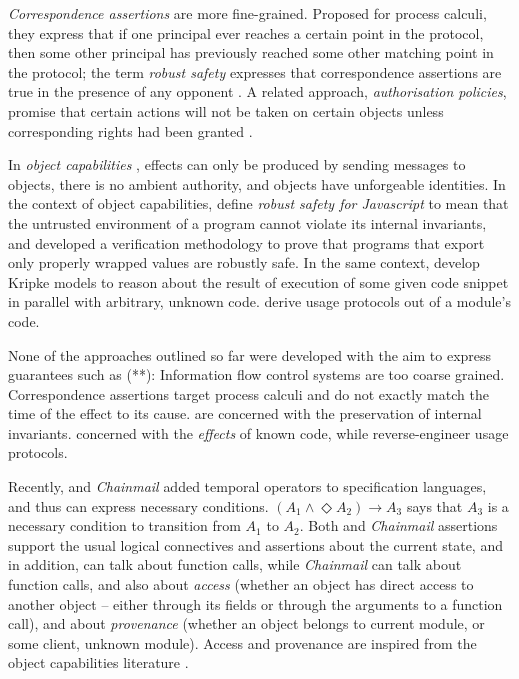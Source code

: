 \emph{Correspondence assertions} are more fine-grained. Proposed for 
process calculi, they %
{express}  that if one principal ever reaches a certain point in the protocol, 
then some other principal has previously reached some other matching point in the protocol; 
the term \emph{robust safety}  expresses that correspondence assertions are true in the presence of any opponent %
\cite{correspondence}. 
A related approach,  \emph{authorisation policies}, 
promise that certain actions will not be taken on certain objects
unless corresponding  rights had been granted  \cite{Maffeis:aiamb:thesis00}.

In   \emph{object capabilities} \cite{MillerPhD},
effects can only be produced by sending messages to objects,  there
is no ambient authority, and  objects 
have unforgeable identities.
In the context of object capabilities, \citeauthor{ddd} define  \emph{robust safety for Javascript}  
to mean that the untrusted environment of a program cannot violate 
its internal invariants, and developed  a verification methodology   to 
prove   that programs that  export only properly wrapped values  are robustly safe.
In the same context, \citeauthor{dd} develop Kripke models to reason about 
the result of execution of some given code snippet in parallel
with arbitrary, unknown code.  
 \cite{threoremsFreeSep} derive usage protocols out of a module's code.

{None} of the approaches outlined so far were developed with
 the aim to express guarantees such as (**):  
  Information flow control systems are too
 coarse grained. Correspondence assertions target process calculi and do not exactly match 
 the time of the effect to its cause. \citeauthor{ddd} are concerned with the preservation of
 internal invariants. \citeauthor{dd}   
 concerned with the \emph{effects} of known code,
 while \cite{threoremsFreeSep}  reverse-engineer usage protocols.
 
Recently,  {}  \cite{VerX}  and   \emph{Chainmail}  \cite{FASE} 
 added temporal operators to specification languages, and thus can express necessary conditions.  $(A_1 \wedge \Diamond A_2) \longrightarrow A_3$ says that  $A_3$ is a necessary condition to
 transition from $A_1$ to $A_2$.
 Both  {}  and   \emph{Chainmail} assertions support the usual 
   logical connectives and assertions about the current state, and in addition,
 {}  can   talk about function calls,
 while \emph{Chainmail} can talk about function calls, 
 and also about \emph{access} (whether an
 object has direct access to another object -- either through its fields or 
 through the arguments to a function call),  and about \emph{provenance} (whether an object
 belongs to current module, or some client, unknown module).
Access and provenance are inspired from the object capabilities
 literature \cite{MillerPhD}. 
 
